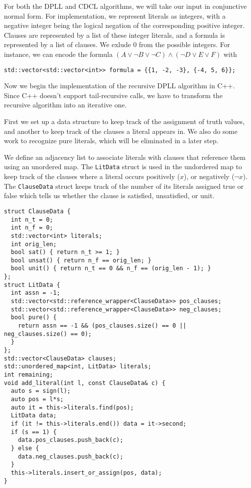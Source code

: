 \documentclass[10pt,AMS Euler]{article}
\begin{document}
For both the DPLL and CDCL algorithms, we will take our input in conjunctive normal form. For implementation,
we represent literals as integers, with a negative integer being the logical negation of the corresponding
positive integer. Clauses are represented by a list of these integer literals, and a formula is represented
by a list of clauses. We exlude 0 from the possible integers.
For instance, we can encode the formula \((A \lor \neg B \lor \neg C) \land (\neg D \lor E \lor F)\) with
\begin{verbatim}
std::vector<std::vector<int>> formula = {{1, -2, -3}, {-4, 5, 6}};
\end{verbatim}

Now we begin the implementation of the recursive DPLL algorithm in C++. Since C++ doesn't
support tail-recursive calls, we have to transform the recursive algorithm into an iterative one.

First we set up a data structure to keep track of the assignment of truth values, and another to keep
track of the clauses a literal appears in. We also do some work to recognize pure literals, which
will be eliminated in a later step.

We define an adjacency list to associate literals with clauses that reference them using
an unordered map. The \texttt{LitData} struct is used in the undordered map to keep track of the
clauses where a literal occurs positively (\(x\)), or negatively (\(\neg x\)). The \texttt{ClauseData} struct
keeps track of the number of its literals assigned true or false which tells us whether the clause
is satisfied, unsatisfied, or unit.
\begin{verbatim}
struct ClauseData {
  int n_t = 0;
  int n_f = 0;
  std::vector<int> literals;
  int orig_len;
  bool sat() { return n_t >= 1; }
  bool unsat() { return n_f == orig_len; }
  bool unit() { return n_t == 0 && n_f == (orig_len - 1); }
};
struct LitData {
  int assn = -1;
  std::vector<std::reference_wrapper<ClauseData>> pos_clauses;
  std::vector<std::reference_wrapper<ClauseData>> neg_clauses;
  bool pure() {
    return assn == -1 && (pos_clauses.size() == 0 || neg_clauses.size() == 0);
  }
};
std::vector<ClauseData> clauses;
std::unordered_map<int, LitData> literals;
int remaining;
void add_literal(int l, const ClauseData& c) {
  auto s = sign(l);
  auto pos = l*s;
  auto it = this->literals.find(pos);
  LitData data;
  if (it != this->literals.end()) data = it->second;
  if (s == 1) {
    data.pos_clauses.push_back(c);
  } else {
    data.neg_clauses.push_back(c);
  }
  this->literals.insert_or_assign(pos, data);
}
\end{verbatim}
\end{document}
